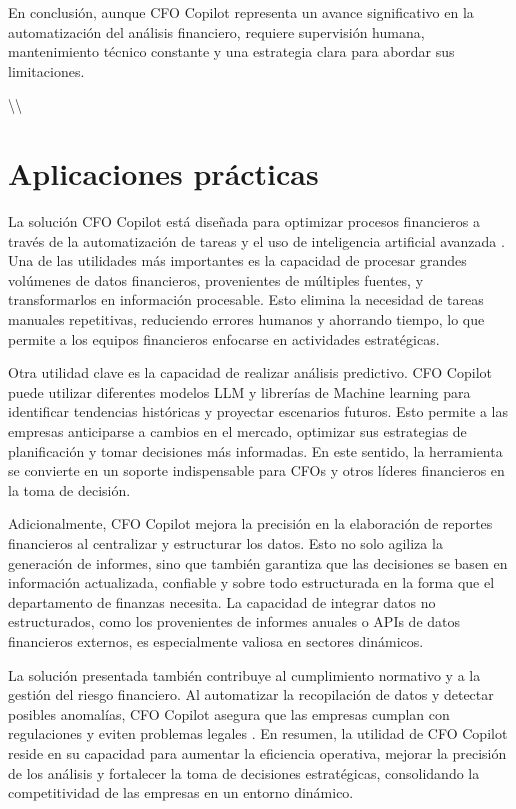 \documentclass[12pt,letterpaper,oneside]{report}
\renewcommand{\_}{\UnderscoreOriginal\allowbreak}
\begin{document}
En conclusión, aunque CFO Copilot representa un avance significativo en la automatización del análisis financiero, requiere supervisión humana, mantenimiento técnico constante y una estrategia clara para abordar sus limitaciones.

\textbackslash{}\textbackslash{}

\section{Aplicaciones prácticas}
La solución CFO Copilot está diseñada para optimizar procesos financieros a través de la automatización de tareas y el uso de inteligencia artificial avanzada \parencite{Andrade2023}. Una de las utilidades más importantes es la capacidad de procesar grandes volúmenes de datos financieros, provenientes de múltiples fuentes, y transformarlos en información procesable. Esto elimina la necesidad de tareas manuales repetitivas, reduciendo errores humanos y ahorrando tiempo, lo que permite a los equipos financieros enfocarse en actividades estratégicas.

Otra utilidad clave es la capacidad de realizar análisis predictivo. CFO Copilot puede utilizar diferentes modelos LLM y librerías de Machine learning para identificar tendencias históricas y proyectar escenarios futuros\parencite{SerranoAnton2022}. Esto permite a las empresas anticiparse a cambios en el mercado, optimizar sus estrategias de planificación y tomar decisiones más informadas. En este sentido, la herramienta se convierte en un soporte indispensable para CFOs y otros líderes financieros en la toma de decisión.

Adicionalmente, CFO Copilot mejora la precisión en la elaboración de reportes financieros al centralizar y estructurar los datos. Esto no solo agiliza la generación de informes, sino que también garantiza que las decisiones se basen en información actualizada, confiable y sobre todo estructurada en la forma que el departamento de finanzas necesita. La capacidad de integrar datos no estructurados, como los provenientes de informes anuales o APIs de datos financieros externos, es especialmente valiosa en sectores dinámicos.

La solución presentada también contribuye al cumplimiento normativo y a la gestión del riesgo financiero. Al automatizar la recopilación de datos y detectar posibles anomalías, CFO Copilot asegura que las empresas cumplan con regulaciones y eviten problemas legales \parencite{Agarwal2024}. En resumen, la utilidad de CFO Copilot reside en su capacidad para aumentar la eficiencia operativa, mejorar la precisión de los análisis y fortalecer la toma de decisiones estratégicas, consolidando la competitividad de las empresas en un entorno dinámico.
\end{document}
